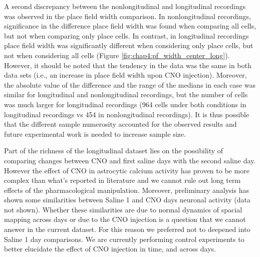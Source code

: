 A second discrepancy between the nonlongitudinal and longitudinal recordings was observed in the place field width comparison. 
In nonlongitudinal recordings, significance in the difference place field width was found when comparing all cells, but not when comparing only place cells. 
In contrast, in longitudinal recordings place field width was significantly different when considering only place cells, but not when considering all cells (Figure \ref{fig:chap4:pf_width_center_long}).
However, it should be noted that the tendency in the data was the same in both data sets (i.e., an increase in place field width upon CNO injection).
Moreover, the absolute value of the difference and the range of the medians in each case was similar for longitudinal and nonlongitudinal recordings, but the number of cells was much larger for longitudinal recordings (964 cells under both conditions in longitudinal recordings vs 454 in nonlongitudinal recordings).
It is thus possible that the different sample numerosity accounted for the observed results and future experimental work is needed to increase sample size.

Part of the richness of the longitudinal dataset lies on the possibility of comparing changes between CNO and first saline days with the second saline day. 
However the effect of CNO in astrocytic calcium activity has proven to be more complex than what's reported in literature and we cannot rule out long term effects of the pharmacological manipulation.
Moreover, preliminary analysis has shown some similarities between Saline 1 and CNO days neuronal activity (data not shown).
Whether these similarities are due to normal dynamics of spacial mapping across days or due to the CNO injection is a question that we cannot answer in the current dataset. 
For this reason we preferred not to deepened into Saline 1 day comparisons. 
We are currently performing control experiments to better elucidate the effect of CNO injection in time, and across days.

